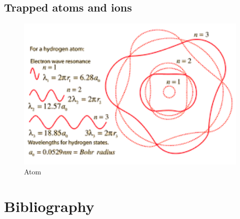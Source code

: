 \documentclass[oneside, letter, 12pt]{book}
\begin{document}
\section{Trapped atoms and ions}

\begin{figure}[h]
\includegraphics[width=12cm]{pic/h-atom.png}
\caption{Atom}
\label{Atom}
\end{figure}


\chapter*{Bibliography}

   

\printindex
\end{document}
